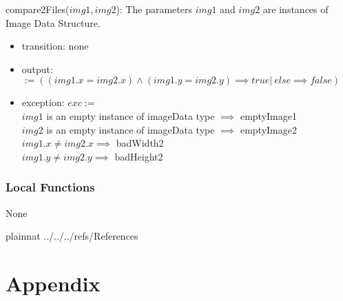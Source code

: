 \documentclass[12pt, titlepage]{article}
\begin{document}
\noindent compare2Files($img1, img2$):
The parameters $img1$ and $img2$ are instances of Image Data Structure.
\begin{itemize}
\item transition: none
\item output: $:= ((img1.x = img2.x) \land (img1.y = img2.y) \implies true |\
else \implies false)$
\item exception: $exc :=$\\
$img1$ is an empty instance of imageData type $\implies$ emptyImage1\\
$img2$ is an empty instance of imageData type $\implies$ emptyImage2\\
$img1.x \not= img2.x \implies$ badWidth2\\
$img1.y \not= img2.y \implies$ badHeight2
\end{itemize}

\subsubsection{Local Functions}

None

\newpage

 {plainnat}
 {../../../refs/References}

\newpage

\section{Appendix} \label{Appendix}

\renewcommand{\arraystretch}{1.2}
\end{document}
